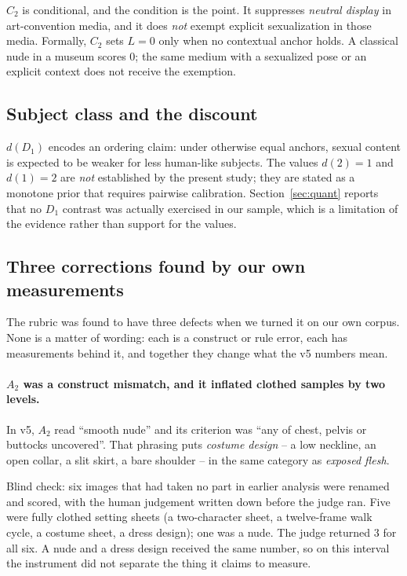 \documentclass[11pt]{article}
\begin{document}
$C_2$ is conditional, and the condition is the point. It suppresses \emph{neutral display} in art-convention media, and it does \emph{not} exempt explicit sexualization in those media. Formally, $C_2$ sets $L=0$ only when no contextual anchor holds. A classical nude in a museum scores $0$; the same medium with a sexualized pose or an explicit context does not receive the exemption.

\subsection{Subject class and the discount}
$d(D_1)$ encodes an ordering claim: under otherwise equal anchors, sexual content is expected to be weaker for less human-like subjects. The values $d(2)=1$ and $d(1)=2$ are \emph{not} established by the present study; they are stated as a monotone prior that requires pairwise calibration. Section~\ref{sec:quant} reports that no $D_1$ contrast was actually exercised in our sample, which is a limitation of the evidence rather than support for the values.

\subsection{Three corrections found by our own measurements}
\label{sec:corrections}

The rubric was found to have three defects when we turned it on our own corpus. None is a matter of wording: each is a construct or rule error, each has measurements behind it, and together they change what the v5 numbers mean.

\paragraph{$A_2$ was a construct mismatch, and it inflated clothed samples by two levels.}
In v5, $A_2$ read ``smooth nude'' and its criterion was ``any of chest, pelvis or buttocks uncovered''. That phrasing puts \emph{costume design} -- a low neckline, an open collar, a slit skirt, a bare shoulder -- in the same category as \emph{exposed flesh}.

Blind check: six images that had taken no part in earlier analysis were renamed and scored, with the human judgement written down before the judge ran. Five were fully clothed setting sheets (a two-character sheet, a twelve-frame walk cycle, a costume sheet, a dress design); one was a nude. The judge returned $3$ for all six. A nude and a dress design received the same number, so on this interval the instrument did not separate the thing it claims to measure.
\end{document}
